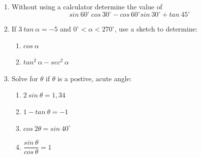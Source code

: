 \begin{eocexercises}{}

\begin{enumerate}[itemsep=6pt, label=\textbf{\arabic*}. ] 
\item Without using a calculator determine the value of 
\begin{equation*}
sin~60^{\circ}~cos~30^{\circ}-cos~60^{\circ}sin~30^{\circ} + tan~45^{\circ}
\end{equation*}
\item If $3~tan~\alpha = -5$ and $0^{\circ} < \alpha < 270^{\circ}$, use a sketch to determine:
    \begin{enumerate}[noitemsep, label=\textbf{(\alph*)} ]
    \item $cos~\alpha$
    \item $tan^{2}~\alpha - sec^{2}~\alpha$
    \end{enumerate}
\item Solve for $\theta$ if $\theta$ is a postive, acute angle:
    \begin{enumerate}[noitemsep, label=\textbf{(\alph*)} ]
    \item $2~sin~\theta = 1,34$
    \item $1 - tan~\theta = -1$
    \item $cos~2\theta = sin~40^{\circ}$ 
    \item $\dfrac{sin~\theta}{cos~\theta}= 1$
    \end{enumerate}



\end{enumerate}
\end{eocexercises}
